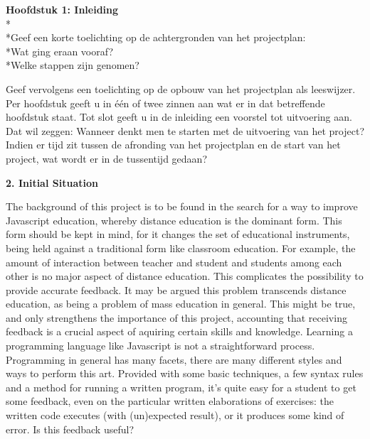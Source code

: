 \documentclass{article}
\begin{document}
\textbf{Hoofdstuk 1: Inleiding}
\\*
\\*Geef een korte toelichting op de achtergronden van het projectplan:
\\*Wat ging eraan vooraf?
\\*Welke stappen zijn genomen?
\newline

\noindent
Geef vervolgens een toelichting op de opbouw van het projectplan als leeswijzer. Per hoofdstuk geeft u in één of twee zinnen aan wat er in dat betreffende hoofdstuk staat. Tot slot geeft u in de inleiding een voorstel tot uitvoering aan.
Dat wil zeggen:
Wanneer denkt men te starten met de uitvoering van het project?
Indien er tijd zit tussen de afronding van het projectplan en de start van het project, wat wordt er in de tussentijd gedaan?
\newline
\newline

\textbf{2. Initial Situation}

\noindent
The background of this project is to be found in the search for a way to improve Javascript education, whereby distance education is the dominant form. This form should be kept in mind, for it changes the set of educational instruments, being held against a traditional form like classroom education. For example, the amount of interaction between teacher and student and students among each other is no major aspect of distance education. This complicates the possibility to provide accurate feedback. It may be argued this problem transcends distance education, as being a problem of mass education in general. This might be true, and only strengthens the importance of this project, accounting that receiving feedback is a crucial aspect of aquiring certain skills and knowledge. 
\newline
Learning a programming language like Javascript is not a straightforward process. Programming in general has many facets, there are many different styles and ways to perform this art. Provided with some basic techniques, a few syntax rules and a method for running a written program, it's quite easy for a student to get some feedback, even on the particular written elaborations of exercises: the written code executes (with (un)expected result), or it produces some kind of error. Is this feedback useful? 
\end{document}
